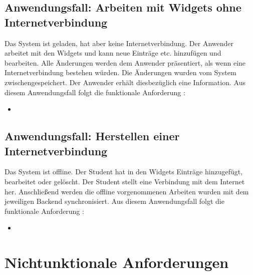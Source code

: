 \subsection{Anwendungsfall: Arbeiten mit Widgets ohne Internetverbindung}
Das System ist geladen, hat aber keine Internetverbindung. Der Anwender arbeitet mit den Widgets und kann neue Einträge etc. hinzufügen und bearbeiten. Alle Änderungen werden dem Anwender präsentiert, als wenn eine Internetverbindung bestehen würden. Die Änderungen wurden vom System zwischengespeichert. Der Anwender erhält diesbezüglich eine Information. Aus diesem Anwendungsfall folgt die funktionale Anforderung :
\begin{itemize}
 \item \requirementf{\requirementOfflineWork}\label{requirementOfflineWork}
\end{itemize}

\subsection{Anwendungsfall: Herstellen einer Internetverbindung}
Das System ist offline. Der Student hat in den Widgets Einträge hinzugefügt, bearbeitet oder gelöscht. Der Student stellt eine Verbindung mit dem Internet her. Anschließend werden die offline vorgenommenen Arbeiten wurden mit dem jeweiligen Backend synchronisiert. Aus diesem Anwendungsfall folgt die funktionale Anforderung :
\begin{itemize}
 \item \requirementf{\requirementOnlineSync}\label{requirementOnlineSync}
\end{itemize}

\section{Nichtunktionale Anforderungen}\label{section:nichtfunktionale_anforderunge}

